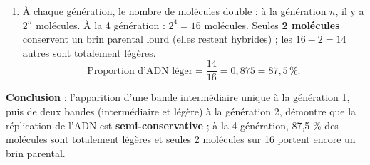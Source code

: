 \documentclass[11pt]{article}
\begin{document}
\begin{exoresolu}
\begin{enumerate}
\item À chaque génération, le nombre de molécules double : à la génération $n$, il y a $2^n$ molécules. À la 4\ieme{} génération : $2^4 = 16$ molécules. Seules \textbf{2 molécules} conservent un brin parental lourd (elles restent hybrides) ; les $16 - 2 = 14$ autres sont totalement légères.
\[ \text{Proportion d'ADN léger} = \frac{14}{16} = 0{,}875 = 87{,}5\,\%. \]
\end{enumerate}
\textbf{Conclusion} : l'apparition d'une bande intermédiaire unique à la génération 1, puis de deux bandes (intermédiaire et légère) à la génération 2, démontre que la réplication de l'ADN est \textbf{semi-conservative} ; à la 4\ieme{} génération, 87,5 \% des molécules sont totalement légères et seules 2 molécules sur 16 portent encore un brin parental.
\end{exoresolu}
\end{document}
